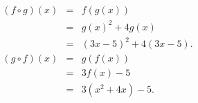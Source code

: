 \begin{eqnarray*}
	(f\circ g)(x)
	& = & f(g(x))\\
	& = & g(x)^2+4g(x)\\
	& = & (3x-5)^2+4(3x-5).\\
	(g\circ f)(x)
	& = & g(f(x))\\
	& = & 3f(x)-5\\
	& = & 3(x^2+4x)-5.
\end{eqnarray*}
